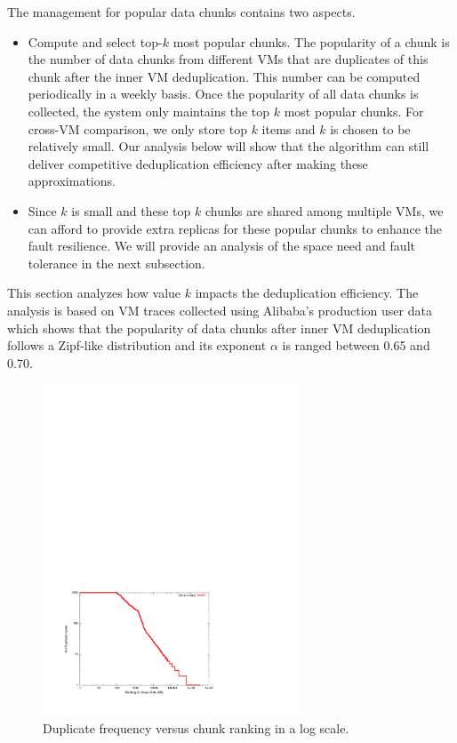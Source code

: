 The management for popular data chunks contains two aspects.
\begin{itemize}
\item Compute and select top-$k$ most popular chunks.
The popularity of a chunk is the number  of data chunks  from different VMs
that are duplicates of this chunk after the inner VM deduplication.
This number can be computed periodically in a weekly basis.
Once the popularity of all data chunks is collected, the system only maintains the top $k$
most popular chunks.  For cross-VM comparison,
we only store  top $k$ items and $k$ is chosen to be relatively small.
Our analysis below will show that the algorithm can still deliver competitive
deduplication efficiency after making these approximations.
\item  Since $k$ is small and these top $k$ chunks are shared among multiple VMs, 
we can afford to provide extra replicas for these popular chunks to enhance the fault resilience.
We will provide an analysis of the space need and fault tolerance in the next subsection.
\end{itemize} 

This section analyzes how value   $k$ impacts the deduplication efficiency.
The analysis is based on VM traces collected
using Alibaba's production user data~\cite{ieeecloud} 
which shows that the popularity of data chunks after inner VM deduplication follows 
a Zipf-like distribution\cite{zipf} and its
exponent $\alpha$ is ranged between 0.65  and  0.70.


\begin{figure}
\centering
 \includegraphics[width=3in]{log-log-disk.pdf}
\caption{Duplicate frequency versus  chunk ranking in a log scale.}
\label{fig:Datazipf}
\end{figure}

